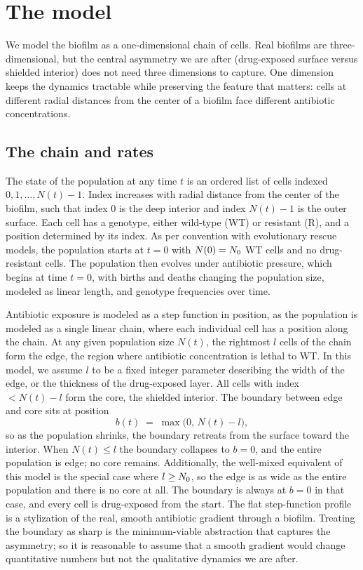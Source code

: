 \section{The model}
\label{sec:model}

We model the biofilm as a one-dimensional chain of cells. Real biofilms are three-dimensional, but the central asymmetry we are after (drug-exposed surface versus shielded interior) does not need three dimensions to capture. One dimension keeps the dynamics tractable while preserving the feature that matters: cells at different radial distances from the center of a biofilm  face different antibiotic concentrations.

\subsection{The chain and rates}
\label{ssec:chain}

The state of the population at any time $t$ is an ordered list of cells indexed $0, 1, \ldots, N(t) - 1$. Index increases with radial distance from the center of the biofilm, such that index $0$ is the deep interior and index $N(t) - 1$ is the outer surface. Each cell has a genotype, either wild-type (WT) or resistant (R), and a position determined by its index. As per convention with evolutionary rescue models, the population starts at $t = 0$ with $N(0) = N_0$ WT cells and no drug-resistant cells. The population then evolves under antibiotic pressure, which begins at time $t = 0$, with births and deaths changing the population size, modeled as linear length, and genotype frequencies over time. 

Antibiotic exposure is modeled as a step function in position, as the population is modeled as a single linear chain, where each individual cell has a position along the chain. At any given population size $N(t)$, the rightmost $l$ cells of the chain form the edge, the region where antibiotic concentration is lethal to WT. In this model, we assume $l$ to be a fixed integer parameter describing the width of the edge, or the thickness of the drug-exposed layer. All cells with index $< N(t) - l$ form the core, the shielded interior. The boundary between edge and core sits at position
\begin{equation}
b(t) \;=\; \max\bigl(0,\, N(t) - l\bigr),
\label{eq:boundary}
\end{equation}
so as the population shrinks, the boundary retreats from the surface toward the interior. When $N(t) \le l$ the boundary collapses to $b = 0$, and the entire population is edge; no core remains. Additionally, the well-mixed equivalent of this model is the special case where $l \ge N_0$, so the edge is as wide as the entire population and there is no core at all. The boundary is always at $b = 0$ in that case, and every cell is drug-exposed from the start. The flat step-function profile is a stylization of the real, smooth antibiotic gradient through a biofilm. Treating the boundary as sharp is the minimum-viable abstraction that captures the asymmetry; so it is reasonable to assume that a smooth gradient would change quantitative numbers but not the qualitative dynamics we are after.


